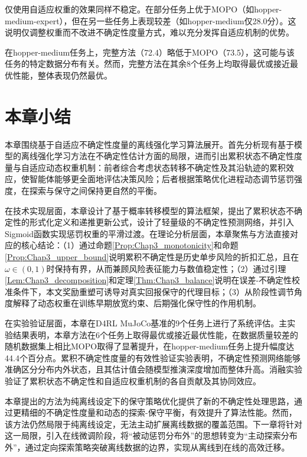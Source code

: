 仅使用自适应权重的效果同样不稳定。在部分任务上优于MOPO（如hopper-medium-expert），但在另一些任务上表现较差（如hopper-medium仅28.0分）。这说明仅调整权重而不改进不确定性度量方式，难以充分发挥自适应机制的优势。

在hopper-medium任务上，完整方法（72.4）略低于MOPO（73.5），这可能与该任务的特定数据分布有关。然而，完整方法在其余8个任务上均取得最优或接近最优性能，整体表现仍然最优。


\section{本章小结}\label{Sec3.5}

本章围绕基于自适应不确定性度量的离线强化学习算法展开。首先分析现有基于模型的离线强化学习方法在不确定性估计方面的局限，进而引出累积状态不确定性度量与自适应动态权重机制：前者综合考虑状态转移不确定性及其沿轨迹的累积效应，使智能体能够更全面地评估决策风险；后者根据策略优化进程动态调节惩罚强度，在探索与保守之间保持更自然的平衡。

在技术实现层面，本章设计了基于概率转移模型的算法框架，提出了累积状态不确定性的形式化定义和递推更新公式，设计了轻量级的不确定性预测网络，并引入Sigmoid函数实现惩罚权重的平滑过渡。在理论分析层面，本章聚焦与方法直接对应的核心结论：（1）通过命题\ref{Prop:Chap3_monotonicity}和命题\ref{Prop:Chap3_upper_bound}说明累积不确定性是历史单步风险的折扣汇总，且在$\omega\in(0,1)$时保持有界，从而兼顾风险表征能力与数值稳定性；（2）通过引理\ref{Lem:Chap3_decomposition}和定理\ref{Thm:Chap3_balance}说明在误差-不确定性校准条件下，本文奖励重塑可诱导对真实回报保守的代理目标；（3）从阶段性调节角度解释了动态权重在训练早期放宽约束、后期强化保守性的作用机制。

在实验验证层面，本章在D4RL MuJoCo基准的9个任务上进行了系统评估。主实验结果表明，本章方法在6个任务上取得最优或接近最优性能，在数据质量较差的随机数据集上相比MOPO取得了显著提升，在hopper-medium任务上提升幅度达44.4个百分点。累积不确定性度量的有效性验证实验表明，不确定性预测网络能够准确区分分布内外状态，且其估计值会随模型推演深度增加而整体升高。消融实验验证了累积状态不确定性和自适应权重机制的各自贡献及其协同效应。

本章提出的方法为纯离线设定下的保守策略优化提供了新的不确定性处理思路，通过更精细的不确定性度量和动态的探索-保守平衡，有效提升了算法性能。然而，该方法仍然局限于纯离线设定，无法主动扩展离线数据的覆盖范围。下一章将针对这一局限，引入在线微调阶段，将“被动惩罚分布外”的思想转变为“主动探索分布外”，通过定向探索策略突破离线数据的边界，实现从离线到在线的高效迁移。
